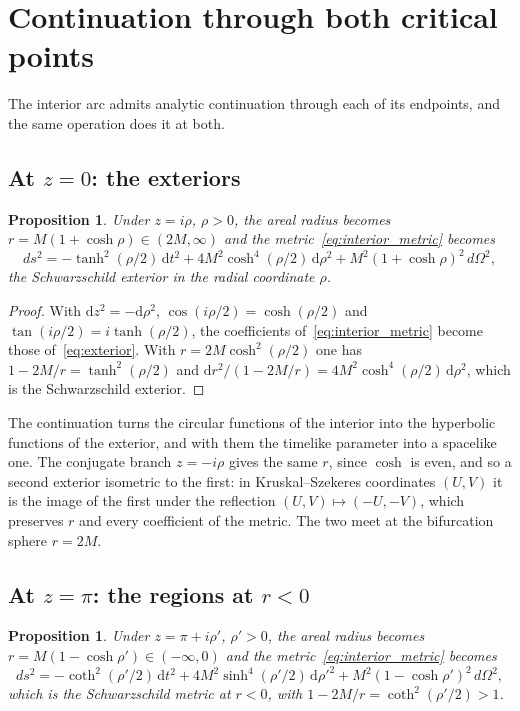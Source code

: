 \documentclass{iopjournal}
\theoremstyle{plain}
\newtheorem{proposition}[theorem]{Proposition}
\theoremstyle{remark}
\newcommand{\dd}{\mathrm{d}}
\begin{document}
\section{Continuation through both critical points}\label{sec:continuation}

The interior arc admits analytic continuation through each of its endpoints, and the same operation does it at both.

\subsection{At $z=0$: the exteriors}

\begin{proposition}\label{prop:exterior}
Under $z=i\rho$, $\rho>0$, the areal radius becomes $r=M(1+\cosh\rho)\in(2M,\infty)$ and the metric~\eqref{eq:interior_metric} becomes
\begin{equation}\label{eq:exterior}
ds^{2}=-\tanh^{2}(\rho/2)\,\dd t^{2}+4M^{2}\cosh^{4}(\rho/2)\,\dd\rho^{2}+M^{2}(1+\cosh\rho)^{2}\,d\Omega^{2},
\end{equation}
the Schwarzschild exterior in the radial coordinate $\rho$.
\end{proposition}

\begin{proof}
With $\dd z^{2}=-\dd\rho^{2}$, $\cos(i\rho/2)=\cosh(\rho/2)$ and $\tan(i\rho/2)=i\tanh(\rho/2)$, the coefficients of~\eqref{eq:interior_metric} become those of~\eqref{eq:exterior}. With $r=2M\cosh^{2}(\rho/2)$ one has $1-2M/r=\tanh^{2}(\rho/2)$ and $\dd r^{2}/(1-2M/r)=4M^{2}\cosh^{4}(\rho/2)\,\dd\rho^{2}$, which is the Schwarzschild exterior.
\end{proof}

The continuation turns the circular functions of the interior into the hyperbolic functions of the exterior, and with them the timelike parameter into a spacelike one. The conjugate branch $z=-i\rho$ gives the same $r$, since $\cosh$ is even, and so a second exterior isometric to the first: in Kruskal--Szekeres coordinates $(U,V)$ it is the image of the first under the reflection $(U,V)\mapsto(-U,-V)$, which preserves $r$ and every coefficient of the metric. The two meet at the bifurcation sphere $r=2M$.

\subsection{At $z=\pi$: the regions at $r<0$}

\begin{proposition}\label{prop:negative}
Under $z=\pi+i\rho'$, $\rho'>0$, the areal radius becomes $r=M(1-\cosh\rho')\in(-\infty,0)$ and the metric~\eqref{eq:interior_metric} becomes
\begin{equation}\label{eq:negative}
ds^{2}=-\coth^{2}(\rho'/2)\,\dd t^{2}+4M^{2}\sinh^{4}(\rho'/2)\,\dd\rho'^{2}+M^{2}(1-\cosh\rho')^{2}\,d\Omega^{2},
\end{equation}
which is the Schwarzschild metric at $r<0$, with $1-2M/r=\coth^{2}(\rho'/2)>1$.
\end{proposition}
\end{document}
